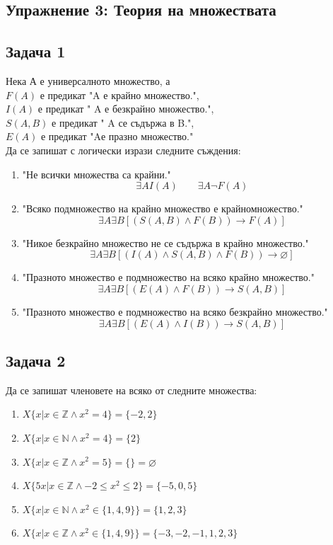 \documentclass[fleqn, 12pt]{article}
\theoremstyle{definition}
\begin{document}
\subsection{Упражнение 3: Теория на множествата}

\subsection*{Задача 1}
Нека А е универсалното множество, а\\
$F(A)$ е предикат "A е крайно множество.",  \\
$I(A)$ е предикат " A е безкрайно множество.", \\
$S(A, B)$ е предикат " A се съдържа в B.", \\
$E(A)$ е предикат "Aе празно множество."  \\
Да се запишат с логически изрази следните съждения:\\
\begin{enumerate}
\item "Не всички множества са крайни."
$$\exists A I(A) \qquad \exists A \neg F(A)$$
\item "Всяко подмножество на крайно множество е крайномножество." 
$$\exists A \exists B [(S(A,B) \land F(B)) \to F(A)]$$
\item "Никое безкрайно множество не се съдържа в крайно множество."
$$\exists A \exists B [(I(A) \land S(A,B) \land F(B)) \to \varnothing]$$
\item "Празното множество е подмножество на всяко крайно множество." 
$$\exists A \exists B [(E(A) \land F(B)) \to S(A,B)]$$
\item "Празното множество е подмножество на всяко безкрайно множество."
$$\exists A \exists B [(E(A) \land I(B)) \to S(A,B)]$$
\end{enumerate}

\subsection*{Задача 2}
Да се запишат членовете на всяко от следните множества:
\begin{enumerate}
\item $X\{x \vert x \in \mathbb{Z} \land x^2 = 4 \} = \{-2,2\}$
\item $X\{x \vert x \in \mathbb{N} \land x^2 = 4 \} = \{2\}$
\item $X\{x \vert x \in \mathbb{Z} \land x^2 = 5 \} = \{\} = \varnothing$
\item $X\{5x \vert x \in \mathbb{Z} \land -2 \leq x^2 \leq 2\} = \{-5,0,5\}$
\item $X\{x \vert x \in \mathbb{N} \land x^2 \in \{1, 4, 9\} \} = \{ 1,2,3\}$
\item $X\{x \vert x \in \mathbb{Z} \land x^2 \in \{1, 4, 9\} \} = \{ -3,-2,-1,1,2,3\}$
\end{enumerate}
\end{document}
